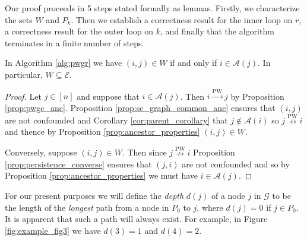 \documentclass[12pt]{article}
\def\pwgc{\overset{\text{PW}}{\rightarrow}}  %
\def\npwgc{\overset{\text{PW}}{\nrightarrow}}  %
\def\gcg{\mathcal{G}}  %
\def\gcge{\mathcal{E}}  %
\newcommand{\anc}[1]{\mathcal{A}(#1)}  %
\begin{document}


Our proof proceeds in 5 steps stated formally as lemmas.  Firstly, we
characterize the sets $W$ and $P_k$.  Then we establish a correctness
result for the inner loop on $r$, a correctness result for the outer
loop on $k$, and finally that the algorithm terminates in a finite
number of steps.

\begin{lemma}
  \label{lem:W_subset_E}
  In Algorithm \ref{alg:pwgr} we have
  $(i, j) \in W$ if and only if $i \in \anc{j}$.  In particular,
  $W \subseteq \gcge$.
\end{lemma}
\begin{proof}
  Let $j \in [n]$ and suppose that $i \in \anc{j}$.  Then $i \pwgc j$
  by Proposition \ref{prop:pwgc_anc}.  Proposition
  \ref{prop:sc_graph_common_anc} ensures that $(i, j)$ are not
  confounded and Corollary \ref{cor:parent_corollary} that
  $j \not\in \anc{i}$ so $j \npwgc i$ and thence by Proposition
  \ref{prop:ancestor_properties} $(i, j) \in W$.

  Conversely, suppose $(i, j) \in W$.  Then since $j \npwgc i$
  Proposition \ref{prop:persistence_converse} ensures that $(j, i)$
  are not confounded and so by Proposition \ref{prop:ancestor_properties}
  we must have $i \in \anc{j}$.
\end{proof}

\begin{definition}[Depth]
  For our present purposes we will define the \textit{depth} $d(j)$ of
  a node $j$ in $\gcg$ to be the length of the \textit{longest} path
  from a node in $P_0$ to $j$, where $d(j) = 0$ if $j \in P_0$.  It is
  apparent that such a path will always exist.  For example, in Figure
  \ref{fig:example_fig3} we have $d(3) = 1$ and $d(4) = 2$.
\end{definition}
\end{document}
